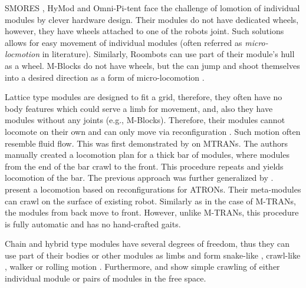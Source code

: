 SMORES \cite{DBLP:conf/iros/DaveyKY12}, HyMod \cite{DBLP:conf/dars/ParrottDG16}
and Omni-Pi-tent \cite{DBLP:conf/taros/PeckTT19} face the challenge of lomotion
of individual modules by clever hardware design. Their modules do not have
dedicated wheels, however, they have wheels attached to one of the robots joint.
Such solutions allows for easy movement of individual modules (often referred as
\emph{micro-locmotion} in literature). Similarly, Roombots
\cite{DBLP:conf/icra/SprowitzBDI09} can use part of their module's hull as a
wheel. M-Blocks do not have wheels, but the can jump and shoot themselves into a
desired direction as a form of micro-locomotion
\cite{DBLP:conf/icra/RomanishinGCR15}.

Lattice type modules are designed to fit a grid, therefore, they often have no
body features which could serve a limb for movement, and, also they have modules
without any joints (e.g., M-Blocks). Therefore, their modules cannot locomote on
their own and can only move via reconfiguration \cite{1285597}. Such motion
often resemble fluid flow. This was first demonstrated by
\textcite{DBLP:conf/iros/YoshidaMKTKK01} on MTRANs. The authors manually created
a locomotion plan for a thick bar of modules, where modules from the end of the
bar crawl to the front. This procedure repeats and yields locomotion of the bar.
The previous approach was further generalized by
\textcite{DBLP:conf/icra/ButlerKRT02}.
\textcite{DBLP:conf/ieeealife/Christensen07} present a locomotion based on
reconfigurations for ATRONs. Their meta-modules can crawl on the surface of
existing robot. Similarly as in the case of M-TRANs, the modules from back move
to front. However, unlike M-TRANs, this procedure is fully automatic and has no
hand-crafted gaits.

Chain and hybrid type modules have several degrees of freedom, thus they can use
part of their bodies or other modules as limbs and form snake-like
\cite{DBLP:conf/icra/YimDR00, DBLP:conf/iros/KamimuraMYKTK01,
DBLP:journals/ijrr/KurokawaTKKHM08, DBLP:journals/arobots/JingTYK18}, crawl-like
\cite{DBLP:conf/icra/YimDR00, DBLP:conf/iros/KamimuraMYKTK01,
DBLP:journals/ijrr/KurokawaTKKHM08, DBLP:journals/arobots/JingTYK18}, walker
\cite{DBLP:conf/iros/KamimuraMYKTK01, DBLP:journals/ijrr/KurokawaTKKHM08,
mtranwalker} or rolling motion \cite{DBLP:journals/ijrr/KurokawaTKKHM08,
DBLP:journals/ijrr/SastraCY09, DBLP:journals/arobots/JingTYK18}. Furthermore,
\cite{DBLP:conf/iros/YimSSPDT07a} and \cite{DBLP:journals/ijrr/KurokawaTKKHM08}
show simple crawling of either individual module or pairs of modules in the free
space.

